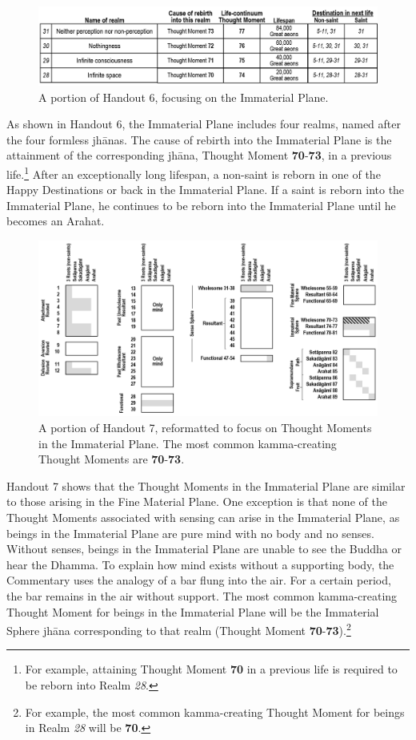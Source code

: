 \begin{figure}[h]
\centering
\includegraphics[width=0.9\linewidth]{./Diagrams/Immaterial1}
\caption{A portion of Handout 6, focusing on the Immaterial Plane.}
\label{fig:Immaterial1}
\end{figure}

As shown in Handout 6, the Immaterial Plane includes four realms, named after the four formless jhānas. The cause of rebirth into the Immaterial Plane is the attainment of the corresponding jhāna, Thought Moment \textbf{70}-\textbf{73}, in a previous life.\footnote{For example, attaining Thought Moment \textbf{70} in a previous life is required to be reborn into Realm \textit{28}.} After an exceptionally long lifespan, a non-saint is reborn in one of the Happy Destinations or back in the Immaterial Plane. If a saint is reborn into the Immaterial Plane, he continues to be reborn into the Immaterial Plane until he becomes an Arahat.

\begin{figure}[h]
\centering
\includegraphics[width=1\linewidth]{./Diagrams/Immaterial}
\caption{A portion of Handout 7, reformatted to focus on Thought Moments in the Immaterial Plane. The most common kamma-creating Thought Moments are \textbf{70}-\textbf{73}.}
\label{fig:Immaterial}
\end{figure}

Handout 7 shows that the Thought Moments in the Immaterial Plane are similar to those arising in the Fine Material Plane. One exception is that none of the Thought Moments associated with sensing can arise in the Immaterial Plane, as beings in the Immaterial Plane are pure mind with no body and no senses. Without senses, beings in the Immaterial Plane are unable to see the Buddha or hear the Dhamma. To explain how mind exists without a supporting body, the Commentary uses the analogy of a bar flung into the air. For a certain period, the bar remains in the air without support. The most common kamma-creating Thought Moment for beings in the Immaterial Plane will be the Immaterial Sphere jhāna corresponding to that realm (Thought Moment \textbf{70}-\textbf{73}).\footnote{For example, the most common kamma-creating Thought Moment for beings in Realm \textit{28} will be \textbf{70}.}

